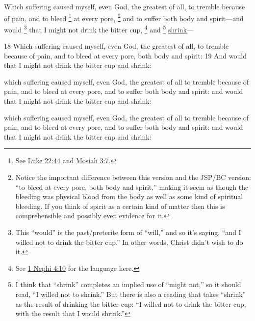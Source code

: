 		Which suffering caused myself, even God, the greatest of all, to tremble because of pain, and to bleed%
			\footnote{%
				See \hyperref[LUKE-22-44]{Luke 22:44} and \hyperref[MOSIAH-3-7]{Mosiah 3:7}.
				}
		at every pore,%
			\footnote{%
				Notice the important difference between this version and the JSP/BC version: ``to bleed at every pore, both body and spirit,'' making it seem as though the bleeding was physical blood from the body as well as some kind of spiritual bleeding. If you think of spirit as a certain kind of matter then this is comprehensible and possibly even evidence for it.
				}
		and to suffer both body and spirit---and would%
			\footnote{%
				This ``would'' is the past/preterite form of ``will,'' and so it's saying, ``and I willed not to drink the bitter cup.'' In other words, Christ didn't wish to do it. 
				}
		that I might not drink the bitter cup,
			\footnote{%
				See \hyperref[1NEPHI-4-10]{1 Nephi 4:10} for the language here.
				}%
		and
			\footnote{%
				I think that ``shrink'' completes an implied use of ``might not,'' so it should read, ``I willed not to shrink.'' But there is also a reading that takes ``shrink'' as the result of drinking the bitter cup: ``I willed not to drink the bitter cup, with the result that I would shrink.'' 
				}%
		\hyperref[SHRINK]{shrink}---
			

		\begin{framed}
		\scriptsize
			\begin{compactdesc}
				\item[JSP] 18 Which suffering caused myself, even God, the greatest of all, to tremble because of pain, and to bleed at every pore, both body and spirit: 19 And would that I might not drink the bitter cup and shrink:
				\item[RB1] [\textit{missing}]
				\item[DC 1835] which suffering caused myself, even God, the greatest of all to tremble because of pain, and to bleed at every pore, and to suffer both body and spirit: and would that I might not drink the bitter cup and shrink: 
				\item[DC 1844] which suffering caused myself, even God, the greatest of all to tremble because of pain, and to bleed at every pore, and to suffer both body and spirit: and would that I might not drink the bitter cup and shrink: 
			\end{compactdesc}
		\end{framed}

